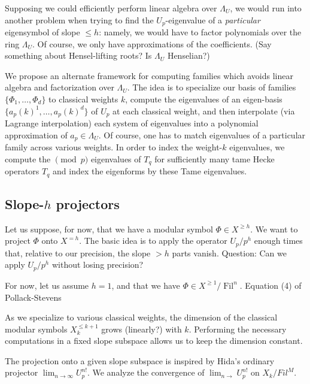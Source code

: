\documentclass[12pt]{article}
\theoremstyle{definition}
\def\bD{\mathbf{D}}
\def\Fil{\operatorname{Fil}}
\begin{document}
Supposing we could efficiently perform linear algebra over $\Lambda_U$, we would run into another problem when trying to find the $U_p$-eigenvalue of a \emph{particular} eigensymbol of slope $\leq h$: namely, we would have to factor polynomials over the ring $\Lambda_U$. Of course, we only have approximations of the coefficients. (Say something about Hensel-lifting roots? Is $\Lambda_U$ Henselian?)

We propose an alternate framework for computing families which avoids linear algebra and factorization over $\Lambda_U$. The idea is to specialize our basis of families $\{\Phi_1,\ldots,\Phi_d\}$ to classical weights $k$, compute the eigenvalues of an eigen-basis $\{a_p(k)^1,\ldots,a_p(k)^d\}$ of $U_p$ at each classical weight, and then interpolate (via Lagrange interpolation) each system of eigenvalues into a polynomial approximation of $a_p\in \Lambda_U$. Of course, one has to match eigenvalues of a particular family across various weights. In order to index the weight-$k$ eigenvalues, we compute the $\pmod p$ eigenvalues of $T_q$ for sufficiently many tame Hecke operators $T_q$ and index the eigenforms by these Tame eigenvalues.



%
\subsection{Slope-$h$ projectors}
Let us suppose, for now, that we have a modular symbol $\Phi\in X^{\geq h}$. We want to project $\Phi$ onto $X^{=h}$. The basic idea is to apply the operator $U_p/p^h$ enough times that, relative to our precision, the slope $>h$ parts vanish. Question: Can we apply $U_p/p^h$ without losing precision?

For now, let us assume $h=1$, and that we have $\Phi\in X^{\geq 1}/\Fil^n$. Equation (4) of Pollack-Stevens 






As we specialize to various classical weights, the dimension of the classical modular symbols $X_k^{\leq k+1}$ grows (linearly?) with $k$. Performing the necessary computations in a fixed slope subspace allows us to keep the dimension constant.

The projection onto a given slope subspace is inspired by Hida's ordinary projector $\lim_{n\rightarrow\infty} U_p^{n!}$. We analyze the convergence of $\lim_{n\rightarrow} U_p^{n!}$ on $X_k/Fil^M$.
\end{document}
